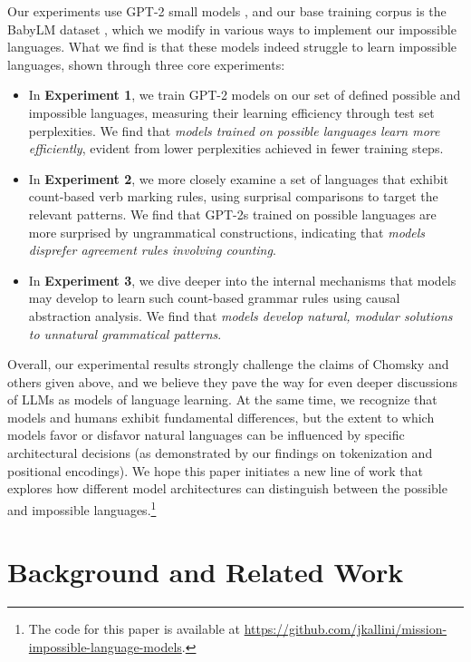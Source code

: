 \documentclass[11pt]{article}
\begin{document}
Our experiments use GPT-2 small models \cite{radford2018improving, radford2019languagemodels},
and our base training corpus is the BabyLM dataset \cite{warstadt2023papers}, which we modify in various ways to implement our impossible languages.
What we find is that these models indeed struggle to learn impossible languages, shown through three core experiments:

\begin{itemize}[topsep=2pt, itemsep=0pt, leftmargin=12pt]
    \item In \textbf{Experiment 1}, we train GPT-2 models on our set of defined possible and impossible languages, measuring their learning efficiency through test set perplexities. We find that \emph{models trained on possible languages learn more efficiently}, evident from lower perplexities achieved in fewer training steps.
    \item In \textbf{Experiment 2}, we more closely examine a set of languages that exhibit count-based verb marking rules, using surprisal comparisons to target the relevant patterns. We find that \mbox{GPT-2s} trained on possible languages are more surprised by ungrammatical constructions, indicating that \emph{models disprefer agreement rules involving counting}.
    \item In \textbf{Experiment 3}, we dive deeper into the internal mechanisms that models may develop to learn such count-based grammar rules using causal abstraction analysis. We find that \emph{models develop natural, modular solutions to unnatural grammatical patterns}.
\end{itemize}

Overall, our experimental results strongly challenge the claims of Chomsky and others given above, and we believe they pave the way for even deeper discussions of LLMs as models of language learning. At the same time, we recognize that models and humans exhibit fundamental differences, but the extent to which models favor or disfavor natural languages can be influenced by specific architectural decisions (as demonstrated by our findings on tokenization and positional encodings). We hope this paper initiates a new line of work that explores how different model architectures can distinguish between the possible and impossible languages.\footnote{The code for this paper is available at \url{https://github.com/jkallini/mission-impossible-language-models}.}


\section{Background and Related Work}
\end{document}
